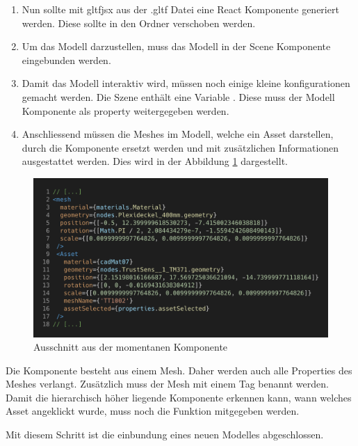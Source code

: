 \begin{enumerate}
  \item Nun sollte mit gltfjsx aus der .gltf Datei eine React Komponente generiert werden. Diese sollte in den  Ordner verschoben werden.
  \item Um das Modell darzustellen, muss das Modell in der Scene Komponente eingebunden werden.
  \item Damit das Modell interaktiv wird, müssen noch einige kleine konfigurationen gemacht werden. Die Szene enthält eine Variable . Diese muss der Modell Komponente als property weitergegeben werden.
  \item Anschliessend müssen die Meshes im Modell, welche ein Asset darstellen, durch die Komponente  ersetzt werden und mit zusätzlichen Informationen ausgestattet werden. Dies wird in der Abbildung \ref{fig:mdl-cmpnt} dargestellt.
\end{enumerate}
\begin{figure}[H]
  \centering
  \includegraphics[width=.7\linewidth]{./images/model.js.png}
  \caption[{Ausschnitt aus der momentanen  Komponente}]{Ausschnitt aus der momentanen  Komponente}
  \label{fig:mdl-cmpnt}
\end{figure}
Die  Komponente besteht aus einem Mesh. Daher werden auch alle Properties des Meshes verlangt. Zusätzlich muss der Mesh mit einem Tag benannt werden. Damit die hierarchisch höher liegende Komponente erkennen kann, wann welches Asset angeklickt wurde, muss noch die Funktion  mitgegeben werden.

Mit diesem Schritt ist die einbundung eines neuen Modelles abgeschlossen.
